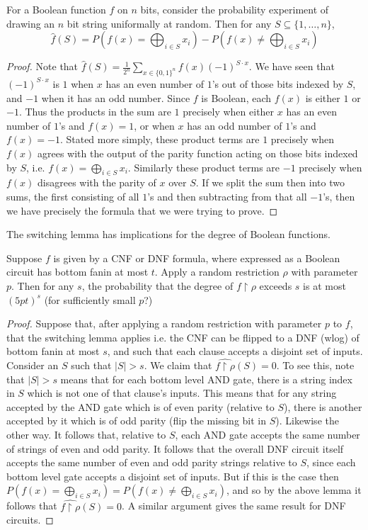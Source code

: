 \begin{lemma}
	For a Boolean function $f$ on $n$ bits, consider the probability experiment of drawing an $n$ bit string uniformally at random. Then for any $S \subseteq \{1,\ldots,n\}$,
	\[ \hat{f}(S) = P\left(f(x) = \bigoplus_{i \in S} x_i \right) - P\left(f(x) \neq \bigoplus_{i \in S} x_i \right) \]
\end{lemma}
\begin{proof}
	Note that $\hat{f}(S) = \frac{1}{2^n}\sum_{x \in \{0,1\}^n} f(x)(-1)^{S \cdot x}$. We have seen that $(-1)^{S \cdot x}$ is $1$ when $x$ has an even number of $1$'s out of those bits indexed by $S$, and $-1$ when it has an odd number. Since $f$ is Boolean, each $f(x)$ is either $1$ or $-1$. Thus the products in the sum are $1$ precisely when either $x$ has an even number of $1$'s and $f(x) = 1$, or when $x$ has an odd number of $1$'s and $f(x) = -1$. Stated more simply, these product terms are $1$ precisely when $f(x)$ agrees with the output of the parity function acting on those bits indexed by $S$, i.e. $f(x) = \bigoplus_{i \in S} x_i$. Similarly these product terms are $-1$ precisely when $f(x)$ disagrees with the parity of $x$ over $S$. If we split the sum then into two sums, the first consisting of all $1$'s and then subtracting from that all $-1$'s, then we have precisely the formula that we were trying to prove. 
\end{proof}
The switching lemma has implications for the degree of Boolean functions. 
\begin{lemma}
	Suppose $f$ is given by a CNF or DNF formula, where expressed as a Boolean circuit has bottom fanin at most $t$. Apply a random restriction $\rho$ with parameter $p$. Then for any $s$, the probability that the degree of $f\restriction \rho$ exceeds $s$ is at most $(5pt)^s$ (for sufficiently small $p$?)
\end{lemma}
\begin{proof}
	Suppose that, after applying a random restriction with parameter $p$ to $f$, that the switching lemma applies i.e. the CNF can be flipped to a DNF (wlog) of bottom fanin at most $s$, and such that each clause accepts a disjoint set of inputs. Consider an $S$ such that $|S| > s$. We claim that $\hat{f \restriction \rho}(S) = 0$. To see this, note that $|S| > s$ means that for each bottom level AND gate, there is a string index in $S$ which is not one of that clause's inputs. This means that for any string accepted by the AND gate which is of even parity (relative to $S$), there is another accepted by it which is of odd parity (flip the missing bit in $S$). Likewise the other way. It follows that, relative to $S$, each AND gate accepts the same number of strings of even and odd parity. It follows that the overall DNF circuit itself accepts the same number of even and odd parity strings relative to $S$, since each bottom level gate accepts a disjoint set of inputs. But if this is the case then $P\left(f(x) = \bigoplus_{i \in S} x_i \right) = P\left(f(x) \neq \bigoplus_{i \in S} x_i \right)$, and so by the above lemma it follows that $\hat{f\restriction \rho}(S) = 0$. A similar argument gives the same result for DNF circuits.
\end{proof}

